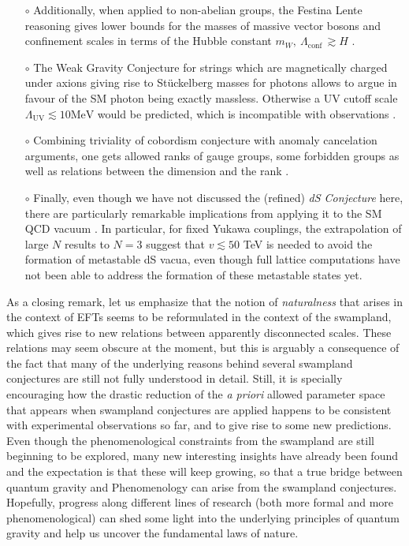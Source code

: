 \documentclass[11pt,a4paper]{article}
\begin{document}
\begin{itemize}
\item[$\circ$]{Additionally, when applied to non-abelian groups, the Festina Lente reasoning gives lower bounds for the masses of massive vector bosons and  confinement scales in terms of the Hubble constant $m_{W}, \ \Lambda_{\mathrm{conf}} \, \gtrsim H$ \cite{Montero:2021otb}. 
}

\item[$\circ$]{The Weak Gravity Conjecture for strings which are magnetically charged under axions giving rise to St\"uckelberg masses for photons allows to argue in favour of the SM photon being exactly massless. Otherwise a UV cutoff scale $\Lambda_{\mathrm{UV}} \lesssim   10 \mathrm{MeV}$ would be predicted, which is incompatible with observations \cite{Reece:2018zvv}.
}

\item[$\circ$]{Combining triviality of cobordism conjecture with anomaly cancelation arguments, one gets allowed ranks of gauge groups, some forbidden groups as well as relations between the dimension and the rank \cite{Montero:2020icj,Hamada:2021bbz}.}

\item[$\circ$]{Finally, even though we have not discussed the (refined) \textit{dS Conjecture} \cite{dS1, dS2,dS3} here, there are particularly remarkable implications from applying it to the SM QCD vacuum \cite{March-Russell:2020lkq}. In particular, for fixed Yukawa couplings, the extrapolation of large $N$ results to $N=3$ suggest that $v\lesssim 50$ TeV is needed to avoid the formation of metastable dS vacua, even though full lattice computations have not been able to address the formation of these metastable states yet.  
}
\end{itemize}

As a closing remark, let us emphasize that the notion of \emph{naturalness} that arises in the context of EFTs seems to be reformulated in the context of the swampland, which gives rise to new relations between apparently disconnected scales. These relations may seem obscure at the moment, but this is arguably a consequence of the fact that many of the underlying reasons behind several swampland conjectures are still not fully understood in detail. Still, it is specially encouraging how the drastic reduction of the \textit{a priori} allowed parameter space that appears when swampland conjectures are applied happens to be consistent with experimental observations so far, and to give rise to some new predictions. Even though the phenomenological constraints from the swampland are still beginning to be explored, many new interesting insights have already been found and the expectation is that these will keep growing, so that a true bridge between quantum gravity and Phenomenology can arise from the swampland conjectures. Hopefully, progress along different lines of research (both more formal and more phenomenological) can shed some light into the underlying principles of quantum gravity and help us uncover the fundamental laws of nature.
\end{document}

